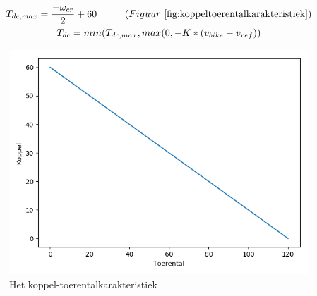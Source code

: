 \documentclass[12pt,a4paper,oneside]{book}
\newcommand\tab[1][1cm]{\hspace*{#1}}
\begin{document}
\begin{gather*}
T_{dc,max} = \frac{-\omega_{cr}}{2}+60 \tab (Figuur\ \ref{fig:koppeltoerentalkarakteristiek}) \\
T_{dc} = min(T_{dc,max},max(0,-K*(v_{bike}-v_{ref}))
\end{gather*}

\begin{figure}
  \includegraphics[width=\linewidth]{images/koppel-toerentalkarakteristiek.png}
  \caption{Het koppel-toerentalkarakteristiek}
  \label{fig:koppeltoerentalkarakteristiek}
\end{figure}
\end{document}
